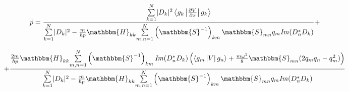 $$\dot{p} = \frac{\underset{k=1}{\overset{N}{\sum}}|D_k|^2\mymean{g_k}{\frac{\partial V}{\partial x}}{g_k}}%
		 {\underset{k=1}{\overset{N}{\sum}}|D_k|^2-%
			 \frac{m}{\hbar p}\mathbbm{H}_{kk}\underset{m,n=1}{\overset{N}{\sum}}\left(\mathbbm{S}^{-1}\right)_{km}%
									\mathbbm{S}_{mn}q_m\mathit{Im}(D_n^*D_k)}+$$

$$	   +\frac{\frac{2m}{\hbar p}\mathbbm{H}_{kk}%
			      \underset{m,n=1}{\overset{N}{\sum}}%
			      \left(\mathbbm{S}^{-1}\right)_{km}\mathit{Im}(D_n^*D_k)%
					    \left(\mymean{g_m}{V}{g_n}+%
						  \frac{m\omega^2}{8}\mathbbm{S}_{mn}(2q_mq_n-q_m^2)\right)}
		 {\underset{k=1}{\overset{N}{\sum}}|D_k|^2-%
			 \frac{m}{\hbar p}\mathbbm{H}_{kk}\underset{m,n=1}{\overset{N}{\sum}}\left(\mathbbm{S}^{-1}\right)_{km}%
									\mathbbm{S}_{mn}q_m\mathit{Im}(D_n^*D_k)}$$

